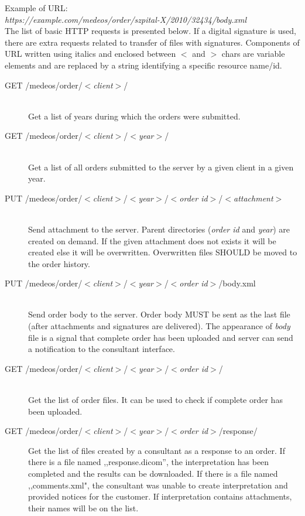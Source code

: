 \documentclass[a4paper]{article}
\begin{document}
Example of URL:\\
\emph{https://example.com/medeos/order/szpital-X/2010/32434/body.xml}\\


The list of basic HTTP requests is presented below. If a digital signature is used, there
are extra requests related to transfer of files with signatures. Components of URL written
using italics and enclosed between $<$ and $>$ chars are variable elements and are replaced by 
a string identifying a specific resource name/id.

\begin{description}
  \item[GET /medeos/order/$<$\emph{client}$>$/]  \hfill \\
  Get a list of years during which the orders were submitted.

  \item[GET /medeos/order/$<$\emph{client}$>$/$<$\emph{year}$>$/]  \hfill \\
  Get a list of all orders submitted to the server by a given client in a given year.
  
  \item[PUT /medeos/order/$<$\emph{client}$>$/$<$\emph{year}$>$/$<$\emph{order id}$>$/$<$\emph{attachment}$>$] \hfill \\ 
  Send attachment to the server. Parent directories (\emph{order id} and \emph{year})
  are created on demand. If the given attachment does not exists it will be
  created else it will be overwritten. Overwritten files SHOULD be moved to
  the order history.
  
  \item[PUT /medeos/order/$<$\emph{client}$>$/$<$\emph{year}$>$/$<$\emph{order id}$>$/body.xml] \hfill \\ 
  Send order body to the server. Order body MUST be sent as the last file (after 
  attachments and signatures are delivered). The appearance of \emph{body} file is a 
  signal that complete order has been uploaded
  and server can send a notification to the consultant interface. 

  \item[GET /medeos/order/$<$\emph{client}$>$/$<$\emph{year}$>$/$<$\emph{order id}$>$/]  \hfill \\
  Get the list of order files. It can be used to check if complete order has been
  uploaded.

  \item[GET /medeos/order/$<$\emph{client}$>$/$<$\emph{year}$>$/$<$\emph{order id}$>$/response/]  
  Get the list of files created by a consultant as a response to an order. If there is a 
  file named ,,response.dicom'', the interpretation has been completed and the results can be 
  downloaded. If there is a file named ,,comments.xml", the consultant was unable to create 
  interpretation and provided notices for the customer. If interpretation contains 
  attachments, their names will be on the list.


\end{description}
\end{document}
